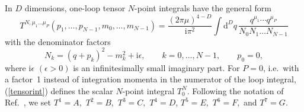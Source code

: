 \documentclass[preprint,sort&compress,12pt]{elsarticle}
\def\beq{\begin{equation}}
\def\eeq{\end{equation}}
\def\eps{\epsilon}
\def\refeq#1{\mbox{(\ref{#1})}}
\def\citere#1{\mbox{Ref.~\cite{#1}}}
\def\citeres#1{\mbox{Refs.~\cite{#1}}}
\newcommand{\ri}{{\mathrm{i}}}
\newcommand{\rd}{{\mathrm{d}}}
\def\ie{i.e.\ }
\begin{document}
In $D$ dimensions, 
one-loop tensor $N$-point integrals have the general form
\beq
\label{tensorint}
T^{N,\mu_{1}\ldots\mu_{P}}(p_{1},\ldots,p_{N-1},m_{0},\ldots,m_{N-1})=
\displaystyle{\frac{(2\pi\mu)^{4-D}}{\ri\pi^{2}}\int \rd^{D}q\,
\frac{q^{\mu_{1}}\cdots q^{\mu_{P}}}
{N_0N_1\ldots N_{N-1}}}
\eeq
with the denominator factors
\beq \label{D0Di}
N_{k}= (q+p_{k})^{2}-m_{k}^{2}+\ri\epsilon, \qquad k=0,\ldots,N-1 ,
\qquad p_0=0,
\eeq
where $\ri\epsilon$ $(\eps>0)$ is an infinitesimally small imaginary
part.  For $P=0$, \ie with a factor~1 instead of
integration momenta in the numerator of the
loop integral, \refeq{tensorint} defines the scalar $N$-point integral
$T^N_0$.  Following the notation of \citere{'tHooft:1978xw}, we set
$T^{1}= A,$ $T^{2}= B,$ $T^{3}= C,$ $T^{4}= D$, $T^{5}= E,$ $T^{6}=
F,$ and $T^{7}=G$.  
\end{document}
